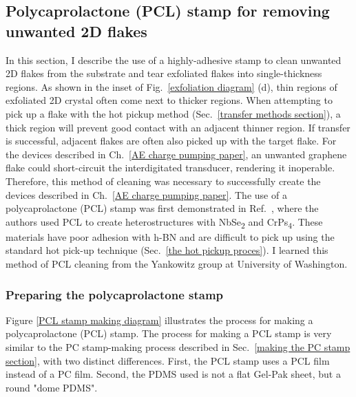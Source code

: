 \documentclass[double,12pt,1in,seploa]{beavtex}
\let\Oldsubsection\subsection
\renewcommand{\subsection}{\FloatBarrier\Oldsubsection}
\let\Oldsubsubsection\subsubsection
\renewcommand{\subsubsection}{\FloatBarrier\Oldsubsubsection}
\begin{document}
\subsection{Polycaprolactone (PCL) stamp for removing unwanted 2D flakes}
In this section, I describe the use of a highly-adhesive stamp to clean unwanted 2D flakes from the substrate and tear exfoliated flakes into single-thickness regions. As shown in the inset of Fig.\ \ref{exfoliation diagram} (d), thin regions of exfoliated 2D crystal often come next to thicker regions. When attempting to pick up a flake with the hot pickup method (Sec.\ \ref{transfer methods section}), a thick region will prevent good contact with an adjacent thinner region. If transfer is successful, adjacent flakes are often also picked up with the target flake. For the devices described in Ch.\ \ref{AE charge pumping paper}, an unwanted graphene flake could short-circuit the interdigitated transducer, rendering it inoperable. Therefore, this method of cleaning was necessary to successfully create the devices described in Ch.\ \ref{AE charge pumping paper}. The use of a polycaprolactone (PCL) stamp was first demonstrated in Ref.\ \cite{son_strongly_2020}, where the authors used PCL to create heterostructures with NbSe\textsubscript{2} and CrPs\textsubscript{4}. These materials have poor adhesion with h-BN and are difficult to pick up using the standard hot pick-up technique (Sec.\ \ref{the hot pickup proces}). I learned this method of PCL cleaning from the Yankowitz group at University of Washington. 

\subsubsection{Preparing the polycaprolactone stamp}


Figure \ref{PCL stamp making diagram} illustrates the process for making a polycaprolactone (PCL) stamp. The process for making a PCL stamp is very similar to the PC stamp-making process described in Sec.\ \ref{making the PC stamp section}, with two distinct differences. First, the PCL stamp uses a PCL film instead of a PC film. Second, the PDMS used is not a flat Gel-Pak sheet, but a round "dome PDMS". 
\end{document}
